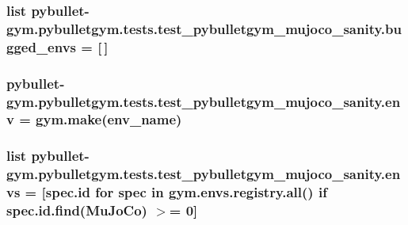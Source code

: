 \subsubsection[{\texorpdfstring{bugged\+\_\+envs}{bugged_envs}}]{\setlength{\rightskip}{0pt plus 5cm}list pybullet-\/gym.\+pybulletgym.\+tests.\+test\+\_\+pybulletgym\+\_\+mujoco\+\_\+sanity.\+bugged\+\_\+envs = \mbox{[}$\,$\mbox{]}}\hypertarget{namespacepybullet-gym_1_1pybulletgym_1_1tests_1_1test__pybulletgym__mujoco__sanity_a9c7eee756049f836811bae3fcf98033d}{}\label{namespacepybullet-gym_1_1pybulletgym_1_1tests_1_1test__pybulletgym__mujoco__sanity_a9c7eee756049f836811bae3fcf98033d}
\subsubsection[{\texorpdfstring{env}{env}}]{\setlength{\rightskip}{0pt plus 5cm}pybullet-\/gym.\+pybulletgym.\+tests.\+test\+\_\+pybulletgym\+\_\+mujoco\+\_\+sanity.\+env = gym.\+make(env\+\_\+name)}\hypertarget{namespacepybullet-gym_1_1pybulletgym_1_1tests_1_1test__pybulletgym__mujoco__sanity_a2e501f9c22728515fa9a745e292de23f}{}\label{namespacepybullet-gym_1_1pybulletgym_1_1tests_1_1test__pybulletgym__mujoco__sanity_a2e501f9c22728515fa9a745e292de23f}
\subsubsection[{\texorpdfstring{envs}{envs}}]{\setlength{\rightskip}{0pt plus 5cm}list pybullet-\/gym.\+pybulletgym.\+tests.\+test\+\_\+pybulletgym\+\_\+mujoco\+\_\+sanity.\+envs = \mbox{[}spec.\+id for spec in gym.\+envs.\+registry.\+all() if spec.\+id.\+find(\textquotesingle{}Mu\+Jo\+Co\textquotesingle{}) $>$= 0\mbox{]}}\hypertarget{namespacepybullet-gym_1_1pybulletgym_1_1tests_1_1test__pybulletgym__mujoco__sanity_acf44996f461bd25dc4a6d286c032c682}{}\label{namespacepybullet-gym_1_1pybulletgym_1_1tests_1_1test__pybulletgym__mujoco__sanity_acf44996f461bd25dc4a6d286c032c682}
